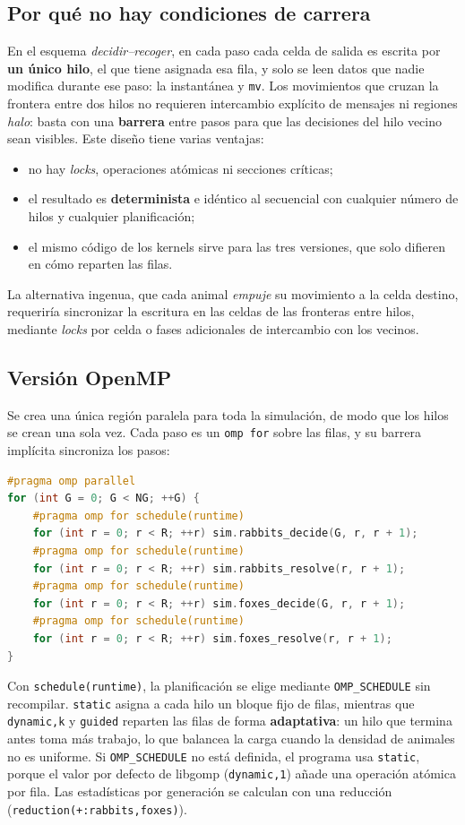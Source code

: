 \documentclass[11pt,a4paper]{article}
\begin{document}
\subsection{Por qué no hay condiciones de carrera}
En el esquema \emph{decidir--recoger}, en cada paso cada celda de salida es escrita por \textbf{un único
hilo}, el que tiene asignada esa fila, y solo se leen datos que nadie modifica durante ese paso: la
instantánea y \texttt{mv}. Los movimientos que cruzan la frontera entre dos hilos no requieren intercambio
explícito de mensajes ni regiones \emph{halo}: basta con una \textbf{barrera} entre pasos para que las
decisiones del hilo vecino sean visibles. Este diseño tiene varias ventajas:
\begin{itemize}[nosep]
  \item no hay \emph{locks}, operaciones atómicas ni secciones críticas;
  \item el resultado es \textbf{determinista} e idéntico al secuencial con cualquier número de hilos y
    cualquier planificación;
  \item el mismo código de los kernels sirve para las tres versiones, que solo difieren en cómo reparten
    las filas.
\end{itemize}
La alternativa ingenua, que cada animal \emph{empuje} su movimiento a la celda destino, requeriría
sincronizar la escritura en las celdas de las fronteras entre hilos, mediante \emph{locks} por celda o
fases adicionales de intercambio con los vecinos.

\subsection{Versión OpenMP}
Se crea una única región paralela para toda la simulación, de modo que los hilos se crean una sola vez.
Cada paso es un \texttt{omp for} sobre las filas, y su barrera implícita sincroniza los pasos:
\begin{lstlisting}[language=C++]
#pragma omp parallel
for (int G = 0; G < NG; ++G) {
    #pragma omp for schedule(runtime)
    for (int r = 0; r < R; ++r) sim.rabbits_decide(G, r, r + 1);
    #pragma omp for schedule(runtime)
    for (int r = 0; r < R; ++r) sim.rabbits_resolve(r, r + 1);
    #pragma omp for schedule(runtime)
    for (int r = 0; r < R; ++r) sim.foxes_decide(G, r, r + 1);
    #pragma omp for schedule(runtime)
    for (int r = 0; r < R; ++r) sim.foxes_resolve(r, r + 1);
}
\end{lstlisting}
Con \texttt{schedule(runtime)}, la planificación se elige mediante \texttt{OMP\_SCHEDULE} sin recompilar.
\texttt{static} asigna a cada hilo un bloque fijo de filas, mientras que \texttt{dynamic,k} y
\texttt{guided} reparten las filas de forma \textbf{adaptativa}: un hilo que termina antes toma más
trabajo, lo que balancea la carga cuando la densidad de animales no es uniforme. Si \texttt{OMP\_SCHEDULE}
no está definida, el programa usa \texttt{static}, porque el valor por defecto de libgomp
(\texttt{dynamic,1}) añade una operación atómica por fila. Las estadísticas por generación se calculan con
una reducción (\texttt{reduction(+:rabbits,foxes)}).
\end{document}
